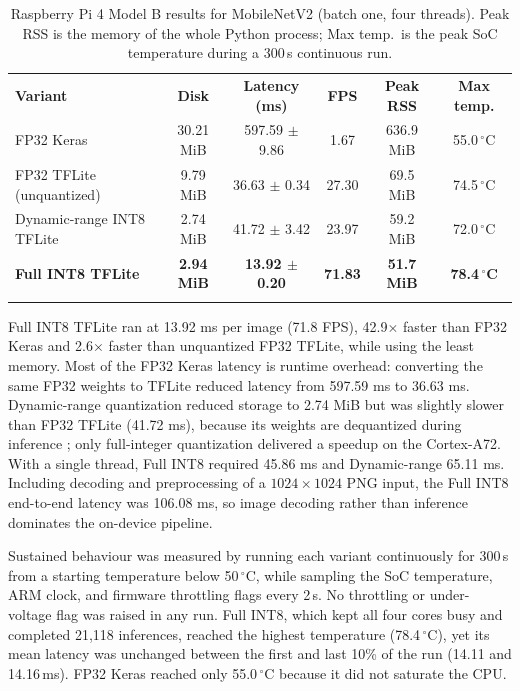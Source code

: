 \documentclass[3p,times,procedia]{elsarticle}
\begin{document}
\begin{table}[htbp]
\centering
\caption{Raspberry Pi 4 Model B results for MobileNetV2 (batch one, four threads). Peak RSS is the memory of the whole Python process; Max temp.\ is the peak SoC temperature during a 300\,s continuous run.}
\label{tab:pi_results}
\begin{tabular*}{\hsize}{@{\extracolsep{\fill}}lccccc}
\toprule
\textbf{Variant} & \textbf{Disk} & \textbf{Latency (ms)} & \textbf{FPS} & \textbf{Peak RSS} & \textbf{Max temp.} \\
\colrule
FP32 Keras & 30.21 MiB & 597.59 $\pm$ 9.86 & 1.67 & 636.9 MiB & 55.0\,$^\circ$C \\
FP32 TFLite (unquantized) & 9.79 MiB & 36.63 $\pm$ 0.34 & 27.30 & 69.5 MiB & 74.5\,$^\circ$C \\
Dynamic-range INT8 TFLite & 2.74 MiB & 41.72 $\pm$ 3.42 & 23.97 & 59.2 MiB & 72.0\,$^\circ$C \\
\textbf{Full INT8 TFLite} & \textbf{2.94 MiB} & \textbf{13.92 $\pm$ 0.20} & \textbf{71.83} & \textbf{51.7 MiB} & \textbf{78.4\,$^\circ$C} \\
\botrule
\end{tabular*}
\end{table}

Full INT8 TFLite ran at 13.92 ms per image (71.8 FPS), 42.9$\times$ faster than FP32 Keras and 2.6$\times$ faster than unquantized FP32 TFLite, while using the least memory. Most of the FP32 Keras latency is runtime overhead: converting the same FP32 weights to TFLite reduced latency from 597.59 ms to 36.63 ms. Dynamic-range quantization reduced storage to 2.74 MiB but was slightly slower than FP32 TFLite (41.72 ms), because its weights are dequantized during inference \cite{krishnamoorthi2018}; only full-integer quantization delivered a speedup on the Cortex-A72. With a single thread, Full INT8 required 45.86 ms and Dynamic-range 65.11 ms. Including decoding and preprocessing of a $1024 \times 1024$ PNG input, the Full INT8 end-to-end latency was 106.08 ms, so image decoding rather than inference dominates the on-device pipeline.

Sustained behaviour was measured by running each variant continuously for 300\,s from a starting temperature below 50\,$^\circ$C, while sampling the SoC temperature, ARM clock, and firmware throttling flags every 2\,s. No throttling or under-voltage flag was raised in any run. Full INT8, which kept all four cores busy and completed 21,118 inferences, reached the highest temperature (78.4\,$^\circ$C), yet its mean latency was unchanged between the first and last 10\% of the run (14.11 and 14.16\,ms). FP32 Keras reached only 55.0\,$^\circ$C because it did not saturate the CPU.
\end{document}
